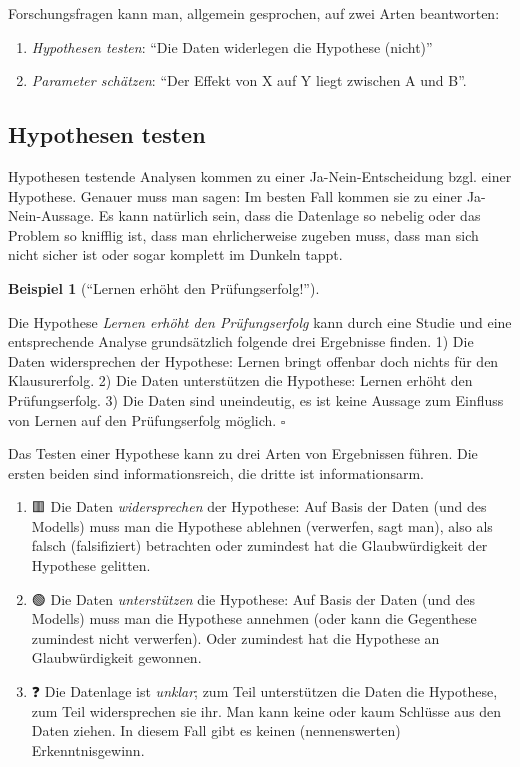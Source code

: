 \documentclass[
  ngerman,
  letterpaper,
  twoside,
  open=any]{scrbook}
\providecommand{\tightlist}{%
  \setlength{\itemsep}{0pt}\setlength{\parskip}{0pt}}\usepackage{longtable,booktabs,array}
\theoremstyle{definition}
\newtheorem{example}{Beispiel}[chapter]
\theoremstyle{plain}
\theoremstyle{definition}
\theoremstyle{definition}
\theoremstyle{definition}
\newtheorem{example}{Beispiel}[chapter]
\theoremstyle{definition}
\theoremstyle{remark}
\begin{document}
Forschungsfragen kann man, allgemein gesprochen, auf zwei Arten
beantworten:

\begin{enumerate}
\def\labelenumi{\arabic{enumi}.}
\tightlist
\item
  \emph{Hypothesen testen}: \enquote{Die Daten widerlegen die Hypothese
  (nicht)}
\item
  \emph{Parameter schätzen}: \enquote{Der Effekt von X auf Y liegt
  zwischen A und B}.
\end{enumerate}

\subsection{Hypothesen testen}\label{hypothesen-testen}

Hypothesen testende Analysen kommen zu einer Ja-Nein-Entscheidung bzgl.
einer Hypothese. Genauer muss man sagen: Im besten Fall kommen sie zu
einer Ja-Nein-Aussage. Es kann natürlich sein, dass die Datenlage so
nebelig oder das Problem so knifflig ist, dass man ehrlicherweise
zugeben muss, dass man sich nicht sicher ist oder sogar komplett im
Dunkeln tappt.

\begin{example}[\enquote{Lernen erhöht den
Prüfungserfolg!}]\protect\hypertarget{exm-lernen-hyp}{}\label{exm-lernen-hyp}

Die Hypothese \emph{Lernen erhöht den Prüfungserfolg} kann durch eine
Studie und eine entsprechende Analyse grundsätzlich folgende drei
Ergebnisse finden. 1) Die Daten widersprechen der Hypothese: Lernen
bringt offenbar doch nichts für den Klausurerfolg. 2) Die Daten
unterstützen die Hypothese: Lernen erhöht den Prüfungserfolg. 3) Die
Daten sind uneindeutig, es ist keine Aussage zum Einfluss von Lernen auf
den Prüfungserfolg möglich. \(\square\)

\end{example}

Das Testen einer Hypothese kann zu drei Arten von Ergebnissen führen.
Die ersten beiden sind informationsreich, die dritte ist
informationsarm.

\begin{enumerate}
\def\labelenumi{\arabic{enumi}.}
\item
  🟥 Die Daten \emph{widersprechen} der Hypothese: Auf Basis der Daten
  (und des Modells) muss man die Hypothese ablehnen (verwerfen, sagt
  man), also als falsch (falsifiziert) betrachten oder zumindest hat die
  Glaubwürdigkeit der Hypothese gelitten.
\item
  🟢 Die Daten \emph{unterstützen} die Hypothese: Auf Basis der Daten
  (und des Modells) muss man die Hypothese annehmen (oder kann die
  Gegenthese zumindest nicht verwerfen). Oder zumindest hat die
  Hypothese an Glaubwürdigkeit gewonnen.
\item
  ❓ Die Datenlage ist \emph{unklar}; zum Teil unterstützen die Daten
  die Hypothese, zum Teil widersprechen sie ihr. Man kann keine oder
  kaum Schlüsse aus den Daten ziehen. In diesem Fall gibt es keinen
  (nennenswerten) Erkenntnisgewinn.
\end{enumerate}
\end{document}
